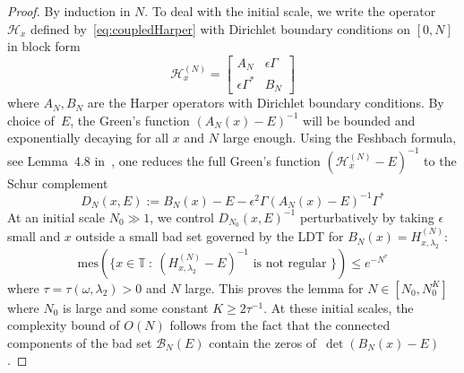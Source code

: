 \documentclass[11pt]{amsart}
\def\mes{\mathrm{mes}}
\def\calB{\mathcal{B}}
\def\calH{\mathcal{H}}
\def\tor{\mathbb{T}}
\begin{document}
\begin{proof}
    By induction in $N$. To deal with the initial scale, we write the   operator $\calH_x$ defined by~\eqref{eq:coupledHarper} with Dirichlet boundary conditions on $[0,N]$  in block  form
    \[
    \calH^{(N)}_x = \left [ \begin{matrix}
        A_N& \epsilon \Gamma \\ \epsilon \Gamma^* &  B_N
    \end{matrix}\right]
    \]
    where $A_N, B_N$ are the Harper operators with Dirichlet boundary conditions. By choice of~$E$, the Green's function $(A_N(x)-E)^{-1}$ will be bounded and exponentially decaying for all $x$ and $N$ large enough. 
      Using the Feshbach formula, see Lemma~4.8 in~\cite{BGS}, one
      reduces the full Green's function $(\calH^{(N)}_x-E)^{-1}$ to the Schur complement 
    \[
    D_N(x,E):= B_N(x)-E - \epsilon^2 \Gamma (A_N(x)-E)^{-1} \Gamma^* 
    \]
    At an initial scale $N_0\gg1$, we control $D_{N_0}(x,E)^{-1}$ perturbatively by taking $\epsilon$ small and $x$ outside a small bad set governed by the LDT for $B_{N}(x)=H^{(N)}_{x,\lambda_2}$:
    \[
    \mes(\{ x\in\tor\::\: (H^{(N)}_{x,\lambda_2}-E)^{-1} \text{\ \ is not regular\  } \})\le e^{-N^\tau}
    \]
    where $\tau=\tau(\omega,\lambda_2)>0$ and $N$ large. 
    This proves the lemma for $N\in [N_0, N_0^K]$ where $N_0$ is large and some constant $K\ge2\tau^{-1}$. At these initial scales, the complexity bound of $O(N)$ follows from the fact that the connected components of the bad set $\calB_{N}(E)$ contain the zeros of~$\det(B_{N}(x)-E)$. 
    

\end{proof}
\end{document}

